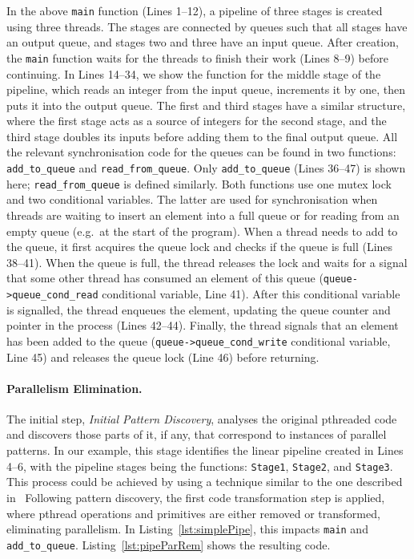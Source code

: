 \noindent
In the above \lstinline|main| function (Lines 1--12), a pipeline of three stages is created using three threads. The stages are connected by queues such that all stages have an output queue, and stages two and three have an input queue. After creation, the \lstinline|main| function waits for the threads to finish their work (Lines 8--9) before continuing. In Lines 14--34, we show the function for the middle stage of the pipeline, which reads an integer from the input queue, increments it by one, then puts it into the output queue. The first and third stages have a similar structure, where the first stage acts as a source of integers for the second stage, and the third stage doubles its inputs before adding them to the final output queue.
%
All the relevant synchronisation code for the queues can be found in two functions: \lstinline{add_to_queue} and \lstinline{read_from_queue}. Only \lstinline{add_to_queue} (Lines 36--47) is shown here; \lstinline{read_from_queue} is defined similarly. Both functions use one mutex lock and two conditional variables. The latter are used for synchronisation when threads are waiting to insert an element into a full queue or for reading from an empty queue (e.g.\ at the start of the program). When a thread needs to add to the queue, it first acquires the queue lock and checks if the queue is full (Lines 38--41).
When the queue is full, the thread releases the lock and waits for a signal that some other thread has consumed an element of this queue (\lstinline{queue->queue_cond_read} conditional variable, Line 41). After this conditional variable is signalled, the thread enqueues the element, updating the queue counter and pointer in the process (Lines 42--44). Finally, the thread signals that an element has been added to the queue (\lstinline{queue->queue_cond_write} conditional variable, Line 45) and releases the queue lock (Line 46) before returning.

\paragraph{Parallelism Elimination.}
The initial step, \emph{Initial Pattern Discovery}, analyses the original pthreaded code and discovers those parts of it, if any, that correspond to instances of parallel patterns. In our example, this stage identifies the linear pipeline created in Lines 4--6, with the pipeline stages being the functions: \lstinline{Stage1}, \lstinline{Stage2}, and \lstinline{Stage3}. This process could be achieved by using a technique similar to the one described in~\cite{hybrid}
Following pattern discovery, the first code transformation step is applied, where pthread operations and primitives are either removed or transformed, eliminating parallelism.
In Listing~\ref{lst:simplePipe}, this impacts \lstinline|main| and \lstinline|add_to_queue|. Listing~\ref{lst:pipeParRem} shows the resulting code.


